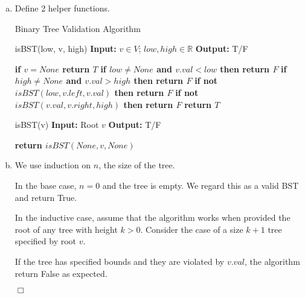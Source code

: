 \documentclass[10pt]{article}
\newenvironment{proof}{\par\noindent{\it Proof.}\hspace*{1em}}{$\Box$\bigskip}
\begin{document}
\begin{solution}

    \begin{enumerate}[(a)]
        \item {
            Define 2 helper functions. 
            
            \begin{algorithm}[H]
                \caption{Binary Tree Validation Algorithm}
                \begin{algorithmic}[1]
                    \Statex isBST(low, v, high)
                    \Statex \textbf{Input:} $v \in V$; $low, high \in \mathbb{R}$
                    \Statex \textbf{Output:} T/F
                    
                    \State \textbf{if $v = None$ return $T$}
                    \State \textbf{if $low \neq None$ and $v.val < low$ then return $F$}
                    \State \textbf{if $high \neq None$ and $v.val > high$ then return $F$}
                    \State \textbf{if not $isBST(low, v.left, v.val)$ then return $F$}
                    \State \textbf{if not $isBST(v.val, v.right, high)$ then return $F$}
                    \State \textbf{return $T$}

                \end{algorithmic}
                \begin{algorithmic}[1]
                    \Statex isBST(v)
                    \Statex \textbf{Input:} Root $v$
                    \Statex \textbf{Output:} T/F
                    
                    \State \textbf{return $isBST(None, v, None)$}
    
                \end{algorithmic}
            \end{algorithm}
        }
        \item {
            \begin{proof}

                We use induction on $n$, the size of the tree. 

                In the base case, $n=0$ and the tree is empty. 
                We regard this as a valid BST and return True. 

                In the inductive case, assume that the algorithm works when provided the root of any tree with height $k > 0$. 
                Consider the case of a size $k+1$ tree specified by root $v$. 
                
                If the tree has specified bounds and they are violated by $v.val$, the algorithm return False as expected. 
                

\end{proof}}
\end{enumerate}
\end{solution}
\end{document}

